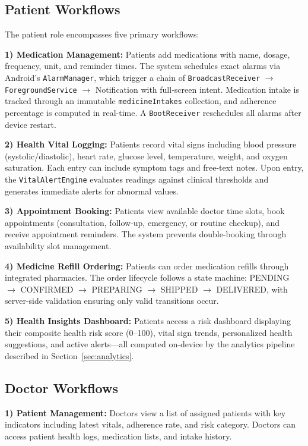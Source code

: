 \documentclass[journal,onecolumn,web]{ieeecolor}
\begin{document}
\subsection{Patient Workflows}
The patient role encompasses five primary workflows:

{\bf 1) Medication Management:} Patients add
medications with name, dosage, frequency, unit, and
reminder times. The system schedules exact alarms via
Android's {\tt AlarmManager}, which trigger a chain
of {\tt BroadcastReceiver} $\rightarrow$
{\tt ForegroundService} $\rightarrow$ Notification
with full-screen intent. Medication intake is tracked
through an immutable {\tt medicineIntakes} collection,
and adherence percentage is computed in real-time. A
{\tt BootReceiver} reschedules all alarms after device
restart.

{\bf 2) Health Vital Logging:} Patients record vital
signs including blood pressure (systolic/diastolic),
heart rate, glucose level, temperature, weight, and
oxygen saturation. Each entry can include symptom tags
and free-text notes. Upon entry, the
{\tt VitalAlertEngine} evaluates readings against
clinical thresholds and generates immediate alerts
for abnormal values.

{\bf 3) Appointment Booking:} Patients view available
doctor time slots, book appointments (consultation,
follow-up, emergency, or routine checkup), and receive
appointment reminders. The system prevents
double-booking through availability slot management.

{\bf 4) Medicine Refill Ordering:} Patients can order
medication refills through integrated pharmacies. The
order lifecycle follows a state machine: PENDING
$\rightarrow$ CONFIRMED $\rightarrow$ PREPARING
$\rightarrow$ SHIPPED $\rightarrow$ DELIVERED, with
server-side validation ensuring only valid transitions
occur.

{\bf 5) Health Insights Dashboard:} Patients access a
risk dashboard displaying their composite health risk
score (0--100), vital sign trends, personalized health
suggestions, and active alerts---all computed on-device
by the analytics pipeline described in
Section~\ref{sec:analytics}.

\subsection{Doctor Workflows}
{\bf 1) Patient Management:} Doctors view a list of
assigned patients with key indicators including latest
vitals, adherence rate, and risk category. Doctors can
access patient health logs, medication lists, and
intake history.
\end{document}
